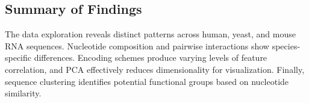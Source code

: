   \subsection{Summary of Findings}\label{subsec:summary-of-findings}
    The data exploration reveals distinct patterns across human, yeast, and mouse RNA sequences. Nucleotide composition and pairwise interactions show species-specific differences. Encoding schemes produce varying levels of feature correlation, and PCA effectively reduces dimensionality for visualization. Finally, sequence clustering identifies potential functional groups based on nucleotide similarity.